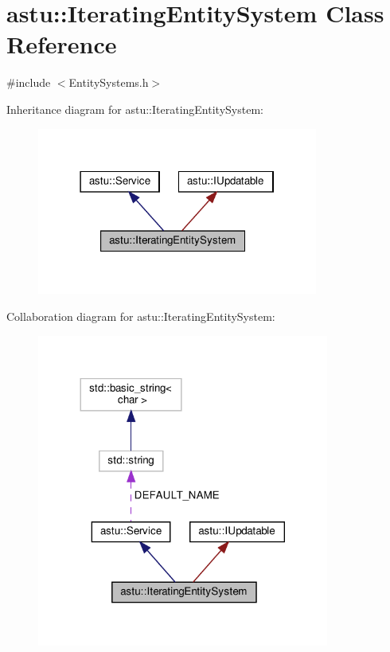 \hypertarget{classastu_1_1IteratingEntitySystem}{}\section{astu\+:\+:Iterating\+Entity\+System Class Reference}
\label{classastu_1_1IteratingEntitySystem}


{\ttfamily \#include $<$Entity\+Systems.\+h$>$}



Inheritance diagram for astu\+:\+:Iterating\+Entity\+System\+:\nopagebreak
\begin{figure}[H]
\begin{center}
\leavevmode
\includegraphics[width=262pt]{classastu_1_1IteratingEntitySystem__inherit__graph}
\end{center}
\end{figure}


Collaboration diagram for astu\+:\+:Iterating\+Entity\+System\+:\nopagebreak
\begin{figure}[H]
\begin{center}
\leavevmode
\includegraphics[width=272pt]{classastu_1_1IteratingEntitySystem__coll__graph}
\end{center}
\end{figure}
